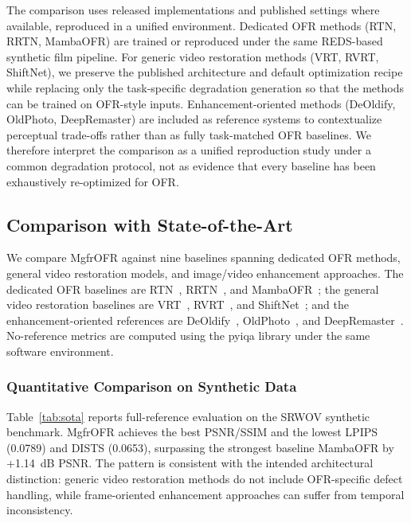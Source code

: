 \documentclass[symmetry,article,submit,pdftex,moreauthors]{Definitions/mdpi}
\begin{document}
The comparison uses released implementations and published settings where available, reproduced in a unified environment. Dedicated OFR methods (RTN, RRTN, MambaOFR) are trained or reproduced under the same REDS-based synthetic film pipeline. For generic video restoration methods (VRT, RVRT, ShiftNet), we preserve the published architecture and default optimization recipe while replacing only the task-specific degradation generation so that the methods can be trained on OFR-style inputs. Enhancement-oriented methods (DeOldify, OldPhoto, DeepRemaster) are included as reference systems to contextualize perceptual trade-offs rather than as fully task-matched OFR baselines. We therefore interpret the comparison as a unified reproduction study under a common degradation protocol, not as evidence that every baseline has been exhaustively re-optimized for OFR.

\subsection{Comparison with State-of-the-Art}
\label{subsec:comparison_sota}

We compare MgfrOFR against nine baselines spanning dedicated OFR methods, general video restoration models, and image/video enhancement approaches. The dedicated OFR baselines are RTN~\cite{wan2022rtn}, RRTN~\cite{lin2024rrtn}, and MambaOFR~\cite{mao2025mambaofr}; the general video restoration baselines are VRT~\cite{liang2024vrt}, RVRT~\cite{liang2022rvrt}, and ShiftNet~\cite{li2023shiftnet}; and the enhancement-oriented references are DeOldify~\cite{jantic2019deoldify}, OldPhoto~\cite{wan2023oldphotopami}, and DeepRemaster~\cite{iizuka2019deepremaster}. No-reference metrics are computed using the pyiqa library under the same software environment.

\subsubsection{Quantitative Comparison on Synthetic Data}

Table~\ref{tab:sota} reports full-reference evaluation on the SRWOV synthetic benchmark. MgfrOFR achieves the best PSNR/SSIM and the lowest LPIPS (0.0789) and DISTS (0.0653), surpassing the strongest baseline MambaOFR by +1.14~dB PSNR. The pattern is consistent with the intended architectural distinction: generic video restoration methods do not include OFR-specific defect handling, while frame-oriented enhancement approaches can suffer from temporal inconsistency.
\end{document}
